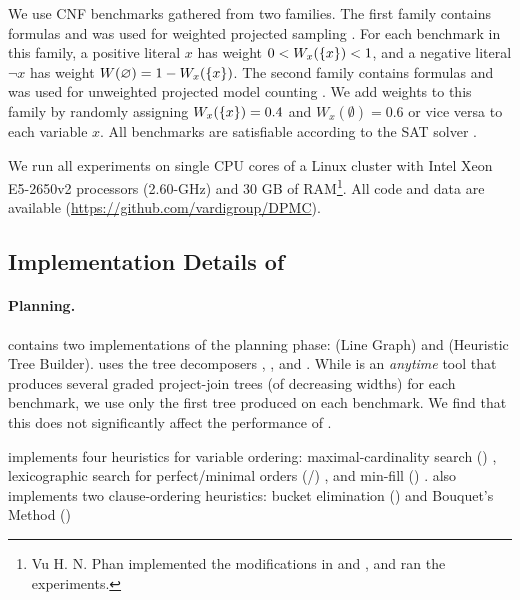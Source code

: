 We use \benchmarks{} CNF benchmarks gathered from two families.
The first family contains \wapsBenchmarks{} formulas and was used for weighted projected sampling \cite{gupta2019waps}.
For each benchmark in this family, a positive literal $x$ has weight $0 < W_x(\left\{ x \right\}) < 1$, and a negative literal $\neg x$ has weight $W(\varnothing) = 1 - W_x(\left\{ x \right\})$.
The second family contains \birdBenchmarks{} formulas and was used for unweighted projected model counting \cite{soos2019bird}.
We add weights to this family by randomly assigning $W_x(\left\{ x \right\}) = 0.4$ and $W_x(\emptyset) = 0.6$ or vice versa to each variable $x$.
All \benchmarks{} benchmarks are satisfiable according to the SAT solver \sat{} \cite{soos2009extending}.

We run all experiments on single CPU cores of a Linux cluster with Intel Xeon E5-2650v2 processors (2.60-GHz) and 30 GB of RAM\footnote{
Vu H. N. Phan implemented the modifications in \Htb{} and \Dmc{}, and ran the experiments.}.
All code and data are available (\url{https://github.com/vardigroup/DPMC}).

\noindent

\subsection{Implementation Details of }
\label{sec:procount:experiments:impl}

\paragraph{Planning.} 
 contains two implementations of the planning phase: \Lg{} (Line Graph) and \Htb{} (Heuristic Tree Builder).
\Lg{} uses the tree decomposers \flowcutter{} \cite{strasser2017computing}, \htd{} \cite{AMW17}, and \tamaki{} \cite{Tamaki17}.
While \Lg{} is an \emph{anytime} tool that produces several graded project-join trees (of decreasing widths) for each benchmark, we use only the first tree produced on each benchmark.
We find that this does not significantly affect the performance of \procount{}.

\htb{} implements four heuristics for variable ordering: maximal-cardinality search (\mcs{}) \cite{tarjan1984simple}, lexicographic search for perfect/minimal orders (\lexp/\lexm{}) \cite{koster2001treewidth}, and min-fill (\minfill{}) \cite{dechter03}.
\htb{} also implements two clause-ordering heuristics: bucket elimination (\be) \cite{dechter99} and Bouquet's Method (\bm) \cite{bouquet1999gestion}%

